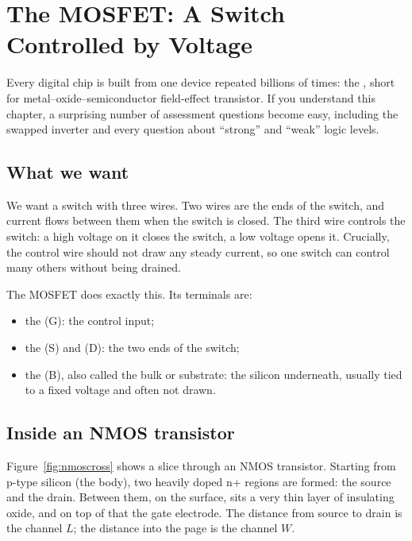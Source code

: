\chapter{The MOSFET: A Switch Controlled by Voltage}
\label{ch:mosfet}

Every digital chip is built from one device repeated billions of times: the , short for metal--oxide--semiconductor field-effect transistor. If you understand this chapter, a surprising number of assessment questions become easy, including the swapped inverter and every question about ``strong'' and ``weak'' logic levels.

\section{What we want}

We want a switch with three wires. Two wires are the ends of the switch, and current flows between them when the switch is closed. The third wire controls the switch: a high voltage on it closes the switch, a low voltage opens it. Crucially, the control wire should not draw any steady current, so one switch can control many others without being drained.

The MOSFET does exactly this. Its terminals are:
\begin{itemize}
  \item the  (G): the control input;
  \item the  (S) and  (D): the two ends of the switch;
  \item the  (B), also called the bulk or substrate: the silicon underneath, usually tied to a fixed voltage and often not drawn.
\end{itemize}

\section{Inside an NMOS transistor}

Figure~\ref{fig:nmoscross} shows a slice through an NMOS transistor. Starting from p-type silicon (the body), two heavily doped n+ regions are formed: the source and the drain. Between them, on the surface, sits a very thin layer of insulating oxide, and on top of that the gate electrode. The distance from source to drain is the channel  $L$; the distance into the page is the channel  $W$.

